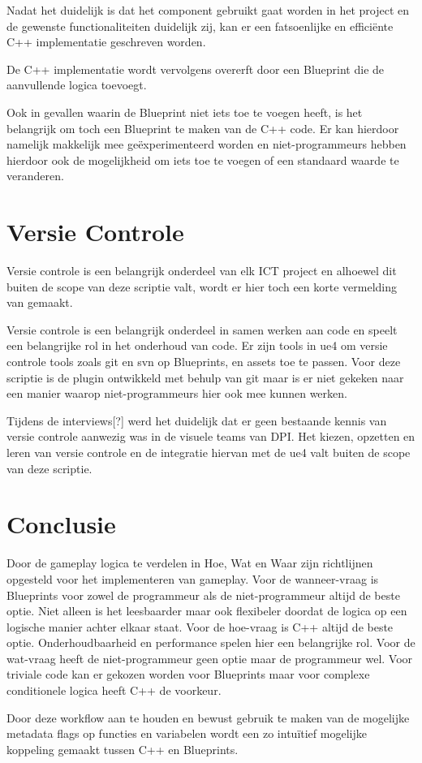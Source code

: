 Nadat het duidelijk is dat het component gebruikt gaat worden in het project en de gewenste functionaliteiten duidelijk zij, kan er een fatsoenlijke en efficiënte C++ implementatie geschreven worden.

De C++ implementatie wordt vervolgens overerft door een Blueprint die de aanvullende logica toevoegt.

Ook in gevallen waarin de Blueprint niet iets toe te voegen heeft, is het belangrijk om toch een Blueprint te maken van de C++ code. Er kan hierdoor namelijk makkelijk mee geëxperimenteerd worden en niet-programmeurs hebben hierdoor ook de mogelijkheid om iets toe te voegen of een standaard waarde te veranderen.

\section{Versie Controle}
Versie controle is een belangrijk onderdeel van elk ICT project en alhoewel dit buiten de scope van deze scriptie valt, wordt er hier toch een korte vermelding van gemaakt.

Versie controle is een belangrijk onderdeel in samen werken aan code en speelt een belangrijke rol in het onderhoud van code. Er zijn tools in \gls{ue4} om versie controle tools zoals git en svn op Blueprints, en assets toe te passen. Voor deze scriptie is de plugin ontwikkeld met behulp van git maar is er niet gekeken naar een manier waarop niet-programmeurs hier ook mee kunnen werken.

Tijdens de interviews[?] werd het duidelijk dat er geen bestaande kennis van versie controle aanwezig was in de visuele teams van DPI. Het kiezen, opzetten en leren van versie controle en de integratie hiervan met de \gls{ue4} valt buiten de scope van deze scriptie.

\section{Conclusie}
Door de gameplay logica te verdelen in Hoe, Wat en Waar zijn richtlijnen opgesteld voor het implementeren van gameplay. Voor de wanneer-vraag is Blueprints voor zowel de programmeur als de niet-programmeur altijd de beste optie. Niet alleen is het leesbaarder maar ook flexibeler doordat de logica op een logische manier achter elkaar staat. Voor de hoe-vraag is C++ altijd de beste optie. Onderhoudbaarheid en performance spelen hier een belangrijke rol. Voor de wat-vraag heeft de niet-programmeur geen optie maar de programmeur wel. Voor triviale code kan er gekozen worden voor Blueprints maar voor complexe conditionele logica heeft C++ de voorkeur. 

Door deze workflow aan te houden en bewust gebruik te maken van de mogelijke metadata flags op functies en variabelen wordt een zo intuïtief mogelijke koppeling gemaakt tussen C++ en Blueprints.